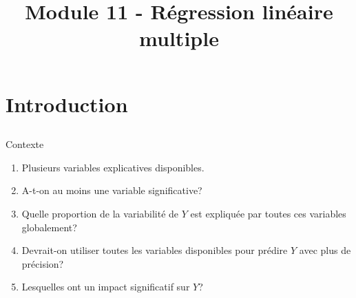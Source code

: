 \documentclass{BeamerTemplate}
\title{Module 11 - Régression linéaire multiple}
\begin{document}
\begin{frame}[t]
  \titlepage
\end{frame}







\section[Intro]{Introduction}
\subsection*{}

\begin{frame}[t]{Contexte}

\begin{enumerate}\itemsep4mm
\item Plusieurs variables explicatives disponibles.
\item A-t-on au moins une variable significative?
\item Quelle proportion de la variabilité de $Y$ est expliquée par toutes ces variables globalement?
\item Devrait-on utiliser toutes les variables disponibles pour prédire $Y$ avec plus de précision?
\item Lesquelles ont un impact significatif sur $Y$?
\end{enumerate}

\end{frame}
\end{document}

